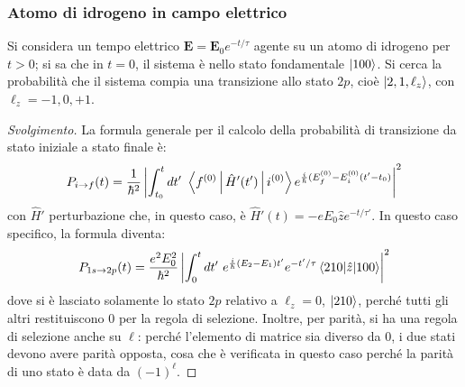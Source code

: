 \documentclass[11pt, a4paper]{scrartcl} %
\numberwithin{equation}{subsection}
\theoremstyle{style2}
\theoremstyle{style1}
\renewcommand\qedsymbol{$\blacksquare$}
\newenvironment{svolgimento}{\renewcommand\qedsymbol{$\spadesuit$}\begin{proof}[Svolgimento]}{\end{proof}}
\begin{document}
\subsubsection{Atomo di idrogeno in campo elettrico}

Si considera un tempo elettrico $\mathbf{E}  = \mathbf{E} _0 e^{- t / \tau } $ agente su un atomo di idrogeno per $t > 0$; si sa che in $t=0$, il sistema \`e nello stato fondamentale $\ket{100} $.
Si cerca la probabilit\`a che il sistema compia una transizione allo stato $2p$, cio\`e $\ket{2,1,\ell _z} $, con $\ell _z = -1,0,+1$.

\begin{svolgimento}
La formula generale per il calcolo della probabilit\`a di transizione da stato iniziale a stato finale \`e:
\begin{equation}
	P_{i\to f} (t) =  \frac{1}{\hbar ^2}\left\lvert \int_{t_0} ^t dt ' \ \Braket{f^{(0)} |\hat{H}'(t')|i^{(0)} } e^{\frac{i}{\hbar } (E_f^{(0)} - E_i^{(0)} (t'-t_0)}  \right\rvert  ^2
\end{equation}
con $\hat{H}'$ perturbazione che, in questo caso, \`e $\hat{H}'(t) = -e E_0 \hat{z} e^{- t / \tau '} $.
In questo caso specifico, la formula diventa:
\[
P_{1s\to 2p} (t) = \frac{e^2 E_0^2}{\hbar ^2}\left\lvert \int_{0} ^t dt ' \ e^{\frac{i}{\hbar } (E_2-E_1) t' }e^{-t ' / \tau } \braket{210|\hat{z}|100}   \right\rvert ^2
\] 
dove si \`e lasciato solamente lo stato $2p$ relativo a $\ell _z = 0$, $\ket{210} $, perch\'e tutti gli altri restituiscono $0$ per la regola di selezione.
Inoltre, per parit\`a, si ha una regola di selezione anche su $\ell $: perch\'e l'elemento di matrice sia diverso da $0$, i due stati devono avere parit\`a opposta, cosa che \`e verificata in questo caso perch\'e la parit\`a di uno stato \`e data da $(-1)^\ell $.


\end{svolgimento}
\end{document}
